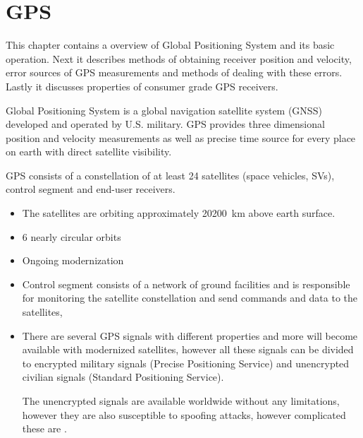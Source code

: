 \chapter{GPS}
\label{chap:gps}

This chapter contains a overview of Global Positioning System and
its basic operation.
Next it describes methods of obtaining receiver position and velocity,
error sources of GPS measurements and methods of dealing with these errors.
Lastly it discusses properties of consumer grade GPS receivers.

Global Positioning System is a global navigation satellite system (GNSS)
developed and operated by U.S. military.
GPS provides three dimensional position and velocity measurements as well as
precise time source for every place on earth with direct satellite visibility.

GPS consists of a constellation of at least 24 satellites (space vehicles, SVs),
control segment and end-user receivers.

\begin{itemize}
\item The satellites are orbiting approximately \SI{20200}{km} above earth surface.
\item 6 nearly circular orbits
\item Ongoing modernization

\item Control segment consists of a network of ground facilities and is responsible for
monitoring the satellite constellation and send commands and data to the satellites,

\item There are several GPS signals with different properties
and more will become available with modernized satellites,
however all these signals can be divided to encrypted military signals 
(Precise Positioning Service) and unencrypted
civilian signals (Standard Positioning Service).

The unencrypted signals are available worldwide without any limitations,
however they are also susceptible to spoofing attacks, however complicated these are
\cite{tippenhauer11}.

\end{itemize}



